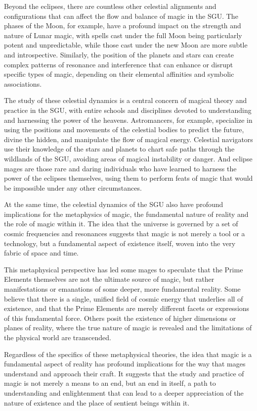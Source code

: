 \documentclass[12pt]{article}
\begin{document}
Beyond the eclipses, there are countless other celestial alignments and configurations that can affect the flow and balance of magic in the SGU. The phases of the Moon, for example, have a profound impact on the strength and nature of Lunar magic, with spells cast under the full Moon being particularly potent and unpredictable, while those cast under the new Moon are more subtle and introspective. Similarly, the position of the planets and stars can create complex patterns of resonance and interference that can enhance or disrupt specific types of magic, depending on their elemental affinities and symbolic associations.

The study of these celestial dynamics is a central concern of magical theory and practice in the SGU, with entire schools and disciplines devoted to understanding and harnessing the power of the heavens. Astromancers, for example, specialize in using the positions and movements of the celestial bodies to predict the future, divine the hidden, and manipulate the flow of magical energy. Celestial navigators use their knowledge of the stars and planets to chart safe paths through the wildlands of the SGU, avoiding areas of magical instability or danger. And eclipse mages are those rare and daring individuals who have learned to harness the power of the eclipses themselves, using them to perform feats of magic that would be impossible under any other circumstances.

At the same time, the celestial dynamics of the SGU also have profound implications for the metaphysics of magic, the fundamental nature of reality and the role of magic within it. The idea that the universe is governed by a set of cosmic frequencies and resonances suggests that magic is not merely a tool or a technology, but a fundamental aspect of existence itself, woven into the very fabric of space and time.

This metaphysical perspective has led some mages to speculate that the Prime Elements themselves are not the ultimate source of magic, but rather manifestations or emanations of some deeper, more fundamental reality. Some believe that there is a single, unified field of cosmic energy that underlies all of existence, and that the Prime Elements are merely different facets or expressions of this fundamental force. Others posit the existence of higher dimensions or planes of reality, where the true nature of magic is revealed and the limitations of the physical world are transcended.

Regardless of the specifics of these metaphysical theories, the idea that magic is a fundamental aspect of reality has profound implications for the way that mages understand and approach their craft. It suggests that the study and practice of magic is not merely a means to an end, but an end in itself, a path to understanding and enlightenment that can lead to a deeper appreciation of the nature of existence and the place of sentient beings within it.
\end{document}
